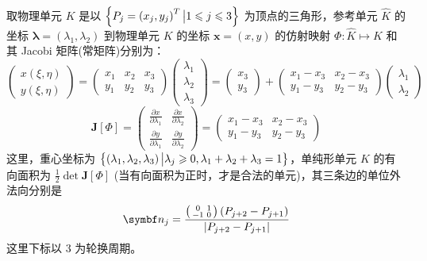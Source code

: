 取物理单元 \(K\) 是以 \(\left\{P_{j} = \left(x_{j}, y_{j}\right)^T \big| 1\leqslant j \leqslant 3\right\}\) 为顶点的三角形，参考单元 \(\widehat{K}\) 的坐标 \(\bm\lambda = \left(\lambda_1, \lambda_2\right)\) 到物理单元 \(K\) 的坐标 \(\bm x = \left(x, y\right)\) 的仿射映射 \(\Phi: \widehat{K} \mapsto K\) 和其 Jacobi 矩阵(常矩阵)分别为：
\begin{equation}
	\begin{pmatrix}
		x(\xi, \eta) \\
		y(\xi, \eta)
	\end{pmatrix}
	= \begin{pmatrix}
		x_1 & x_2 & x_3 \\
		y_1 & y_2 & y_3
	\end{pmatrix}
	\begin{pmatrix}
		\lambda_1 \\
		\lambda_2 \\
		\lambda_3
	\end{pmatrix}
	= \begin{pmatrix}
		x_3 \\ y_3
	\end{pmatrix}
	+ \begin{pmatrix}
		x_1 - x_3 & x_2 - x_3 \\
		y_1 - y_3 & y_2 - y_3
	\end{pmatrix}
	\begin{pmatrix}
		\lambda_1 \\ \lambda_2
	\end{pmatrix}
\end{equation}
\begin{equation}
	\bm J[\Phi]
	= \begin{pmatrix}
		\frac{\partial x}{\partial \lambda_1} & \frac{\partial x}{\partial \lambda_2} \\
		\frac{\partial y}{\partial \lambda_1} & \frac{\partial y}{\partial \lambda_2}
	\end{pmatrix}
	= \begin{pmatrix}
		x_1 - x_3 & x_2 - x_3 \\
		y_1 - y_3 & y_2 - y_3
	\end{pmatrix}
\end{equation}
这里，重心坐标为 \(\left\{\left(\lambda_1, \lambda_2, \lambda_3\right) \big| \lambda_j \geqslant 0, \lambda_1 + \lambda_2 + \lambda_3 = 1\right\}\)，单纯形单元 \(K\) 的有向面积为 \(\frac{1}{2}\det \bm J[\Phi]\) (当有向面积为正时，才是合法的单元)，其三条边的单位外法向分别是
\begin{equation}
	\bm n_j = \frac{\left(\begin{smallmatrix} 0 & 1 \\ -1 & 0 \end{smallmatrix}\right)(P_{j+2} - P_{j+1})}{\abs{P_{j+2} - P_{j+1}}}
\end{equation}
这里下标以 3 为轮换周期。

